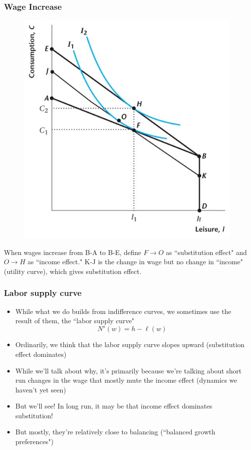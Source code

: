 \documentclass{beamer}
\begin{document}
\begin{frame}
\frametitle[alignment=center]{Wage Increase}
\begin{figure}
\centering
\includegraphics[scale=0.5]{Figures/W_Fig_4pt8.png}
\end{figure}
When wages increase from B-A to B-E, define $F\rightarrow O$ as ``substitution effect" and $O\rightarrow H$ as ``income effect."  K-J is the change in wage but no change in ``income" (utility curve), which gives substitution effect.
\end{frame}

\begin{frame}
\frametitle[alignment=center]{Labor supply curve}
\begin{itemize}
\item While what we do builds from indifference curves, we sometimes use the result of them, the ``labor supply curve"
$$N^s(w)=h-\ell(w)$$
\item Ordinarily, we think that the labor supply curve slopes upward (substitution effect dominates)
\bigskip
\item While we'll talk about why, it's primarily because we're talking about short run changes in the wage that mostly mute the income effect (dynamics we haven't yet seen)
\bigskip
\item But we'll see!  In long run, it may be that income effect dominates substitution!
\bigskip
\item But mostly, they're relatively close to balancing (``balanced growth preferences")
\end{itemize}
\end{frame}
\end{document}
